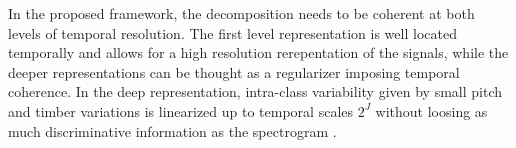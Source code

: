 In the proposed framework, the decomposition needs to be coherent at both levels of temporal resolution.
The first level representation is well located temporally and allows for a high resolution rerepentation of the signals,
while the deeper representations can be thought as a regularizer imposing temporal coherence. 
In the deep representation, intra-class variability given by small pitch and timber variations is linearized up to 
 temporal scales $2^J$ without loosing as much discriminative information as 
the spectrogram \cite{deepscatt,pami}.
%
%
%
%
%
%
